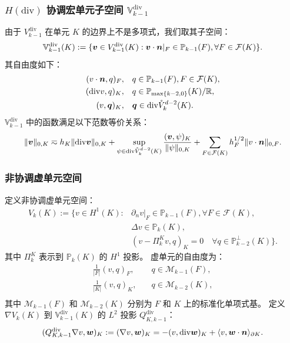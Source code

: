 \documentclass[notheorems,serif]{beamer}
\begin{document}
\begin{frame}
    \frametitle{$H(\mathrm{div})$ 协调宏单元子空间 $\mathbb{V}^{\mathrm{div}}_{k-1}$}
    由于 $V^{\mathrm{div}}_{k-1}$ 在单元 $K$ 的边界上不是多项式，我们取其子空间：
    $$
    \mathbb{V}^{\mathrm{div}}_{k-1}(K) := \{\boldsymbol{v} \in
        V^{\mathrm{div}}_{k-1}(K) :
        \boldsymbol{v} \cdot \boldsymbol{n}|_F \in \mathbb{P}_{k-1}(F),
    \forall F \in \mathcal{F}(K)\}.
    $$
    其自由度如下：
    $$
    \begin{aligned}
        (v\cdot\boldsymbol{n},q)_{F}, & \quad
        q \in \mathbb{P}_{k-1}(F), F \in \mathcal{F}(K), \\
        (\mathrm{div} v, q)_{K}, & \quad q \in \mathbb{P}_{\max\{k-2, 0\}}(K)/\mathbb{R}, \\
        (v, \boldsymbol{q})_K, & \quad
        \boldsymbol{q} \in \mathrm{div} \mathring{V}_k^{d-2}(K).
    \end{aligned}
    $$
    $\mathbb{V}_{k-1}^{\mathrm{div}}$ 中的函数满足以下范数等价关系：
    $$
    \|\boldsymbol{v}\|_{0, K} \eqsim h_K\|\mathrm{div} \boldsymbol{v}\|_{0, K} + 
    \sup_{\psi \in \mathrm{div} \mathring{V}_k^{d-2}(K)}\frac{(\boldsymbol{v},
    \psi)_K}{\|\psi\|_{0, K}} + \sum_{F \in \mathcal{F}(K)}h_F^{1/2}\|v\cdot
    \boldsymbol{n}\|_{0, F}.
    $$
\end{frame}

\begin{frame}
\frametitle{非协调虚单元空间}
定义非协调虚单元空间：
$$
\begin{aligned}
    V_k(K) := \{v \in H^1(K): & \partial_n v|_{F} \in \mathbb{P}_{k-1}(F), 
        \forall F \in \mathcal{F}(K), \\
    & \Delta v \in \mathbb{P}_{k}(K),\\
    & (v-\Pi_k^K v, q)_K = 0 \quad \forall q \in
    \mathbb{P}_{k-2}^{\perp}(K)\}.
\end{aligned}
$$
其中 $\Pi_k^K$ 表示到 $\mathbb{P}_k(K)$ 的 $H^1$ 投影。
虚单元的自由度为：
$$
\begin{aligned}
    \frac{1}{|F|}(v, q)_{F}, & \quad q \in \mathcal{M}_{k-1}(F), \\
    \frac{1}{|K|}(v, q)_{K}, & \quad q \in \mathcal{M}_{k-2}(K), \\
\end{aligned}
$$
其中 $\mathcal{M}_{k-1}(F)$ 和 $\mathcal{M}_{k-2}(K)$ 分别为 $F$ 和 $K$ 上的标准化单项式基。
定义 $\nabla V_k(K)$ 到 $\mathbb{V}^{\mathrm{div}}_{k-1}(K)$ 的 $L^2$ 投影 $Q_{K, k-1}^{\mathrm{div}}$：
$$
(Q_{K, k-1}^{\mathrm{div}}\nabla v, \boldsymbol{w})_K := (\nabla v,
\boldsymbol{w})_K = -(v, \mathrm{div} \boldsymbol{w})_K + \langle v, \boldsymbol{w} 
\cdot \boldsymbol{n}\rangle_{\partial K}.
$$
\end{frame}
\end{document}
